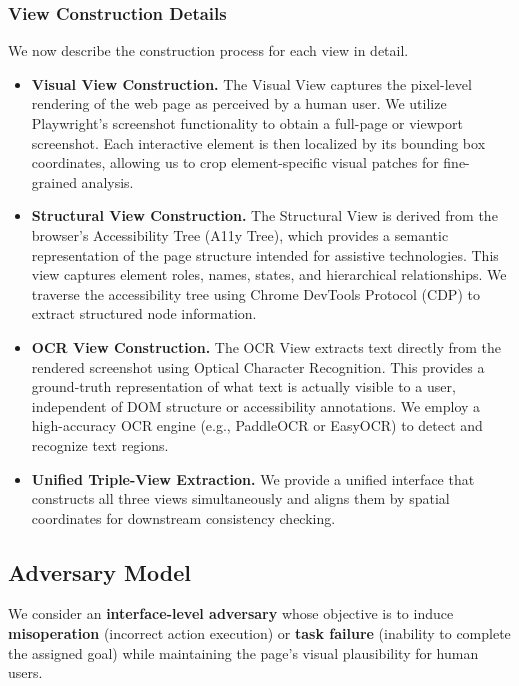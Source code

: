 \documentclass[runningheads]{llncs}
\begin{document}
\subsubsection{View Construction Details}
We now describe the construction process for each view in detail.
\begin{itemize}
    \item \textbf{Visual View Construction.} The Visual View captures the pixel-level rendering of the web page as perceived by a human user. We utilize Playwright's screenshot functionality to obtain a full-page or viewport screenshot. Each interactive element is then localized by its bounding box coordinates, allowing us to crop element-specific visual patches for fine-grained analysis.
    \item \textbf{Structural View Construction.} The Structural View is derived from the browser's Accessibility Tree (A11y Tree), which provides a semantic representation of the page structure intended for assistive technologies. This view captures element roles, names, states, and hierarchical relationships. We traverse the accessibility tree using Chrome DevTools Protocol (CDP) to extract structured node information.
    \item \textbf{OCR View Construction.} The OCR View extracts text directly from the rendered screenshot using Optical Character Recognition. This provides a ground-truth representation of what text is actually visible to a user, independent of DOM structure or accessibility annotations. We employ a high-accuracy OCR engine (e.g., PaddleOCR or EasyOCR) to detect and recognize text regions.
    \item \textbf{Unified Triple-View Extraction.} We provide a unified interface that constructs all three views simultaneously and aligns them by spatial coordinates for downstream consistency checking.
\end{itemize}

\subsection{Adversary Model}
We consider an \textbf{interface-level adversary} whose objective is to induce \textbf{misoperation} (incorrect action execution) or \textbf{task failure} (inability to complete the assigned goal) while maintaining the page's visual plausibility for human users.
\end{document}
